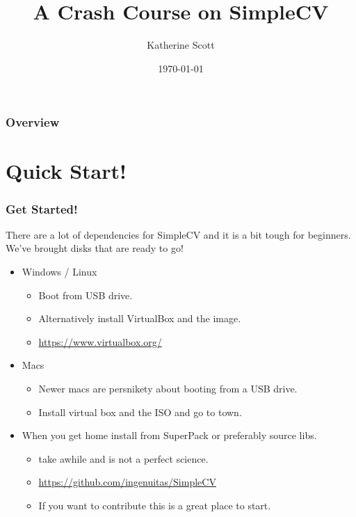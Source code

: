 \documentclass{beamer}
\title[How do I SimpleCV?]{A Crash Course on SimpleCV} %
\author{Katherine Scott} %
\institute[SightMachine] %
{
SightMachine \\ %
\medskip
\textit{kat@sightmachine.com}
}
\date{\today} %
\begin{document}
\begin{frame}
\titlepage %
\end{frame}

\begin{frame}
\frametitle{Overview} %
\tableofcontents %
\end{frame}

\section{Quick Start!}
 \begin{frame}
   \frametitle{Get Started!}
   There are a lot of dependencies for SimpleCV and it is a bit tough for
   beginners. We've brought disks that are ready to go!
   \begin{itemize}
     \item Windows / Linux
       \begin{itemize}
         \item Boot from USB drive.
         \item Alternatively install VirtualBox and the image. 
         \item \url{https://www.virtualbox.org/}
         \end{itemize}
     \item Macs 
       \begin{itemize}
         \item Newer macs are persnikety about booting from a USB drive.
         \item Install virtual box and the ISO and go to town. 
         \end{itemize}
     \item When you get home install from SuperPack or preferably source libs.
       \begin{itemize}
         \item take awhile and is not a perfect science.
         \item \url{https://github.com/ingenuitas/SimpleCV}
         \item If you want to contribute this is a great place to start.
         \end{itemize}
    \end{itemize}
 \end{frame}
\end{document}
